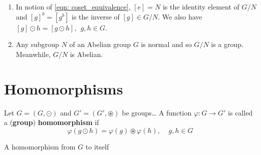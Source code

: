 \begin{remark}
	\begin{enumerate}[label=(\alph*)]
		\item In notion of \ref{eqn: coset_equivalence}, \([e] = N\) is the identity element of
		\(G/N\) and \([g]^b = [g^b]\) is the inverse of \([g] \in G/N\). We also have
		\([g] \odot h = [g\odot h], \:\: g,h\in G\).
		\item Any subgroup \(N\) of an Abelian group \(G\) is normal and so \(G/N\) is a group. 
		Meanwhile, \(G/N\) is Abelian.
	\end{enumerate}
\end{remark}

\section{Homomorphisms}

\begin{definition}[Homomorphism]\label{def: homomorphism}
	Let \(G = \left(G, \odot\right)\) and \(G{}' = \left(G{}', \circledast\right)\) be groups\dots
	A function \(\varphi \colon G \rightarrow G{}'\) is called a (\textbf{group}) \textbf{homomorphism}
	if 
	\[
		\varphi ( g \odot h ) = \varphi(g) \circledast \varphi(h), \:\:\:\:\: g,h\in G
	\]
\end{definition}

\begin{definition}[Endomorphism]\label{def: endomorphism}
	A homomorphism from \(G\) to itself
\end{definition}

